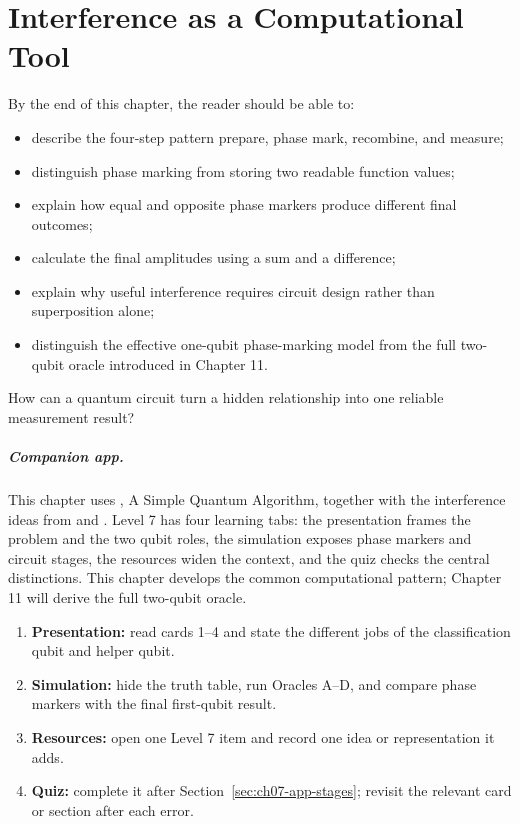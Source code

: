\chapter[Interference and Computation]{Interference as a Computational Tool}
\label{chap:interference-computation}

\begin{learningobjectives}
By the end of this chapter, the reader should be able to:
\begin{itemize}
  \item describe the four-step pattern prepare, phase mark, recombine, and measure;
  \item distinguish phase marking from storing two readable function values;
  \item explain how equal and opposite phase markers produce different final outcomes;
  \item calculate the final amplitudes using a sum and a difference;
  \item explain why useful interference requires circuit design rather than superposition alone;
  \item distinguish the effective one-qubit phase-marking model from the full two-qubit oracle introduced in Chapter 11.
\end{itemize}
\end{learningobjectives}

\begin{openingquestion}
How can a quantum circuit turn a hidden relationship into one reliable measurement result?
\end{openingquestion}

\paragraph{Companion app.}
This chapter uses , A Simple Quantum Algorithm, together with the interference ideas from  and . Level 7 has four learning tabs: the presentation frames the problem and the two qubit roles, the simulation exposes phase markers and circuit stages, the resources widen the context, and the quiz checks the central distinctions. This chapter develops the common computational pattern; Chapter 11 will derive the full two-qubit oracle.

\begin{appactivity}
\begin{enumerate}
  \item \textbf{Presentation:} read cards 1--4 and state the different jobs of the classification qubit and helper qubit.
  \item \textbf{Simulation:} hide the truth table, run Oracles A--D, and compare phase markers with the final first-qubit result.
  \item \textbf{Resources:} open one Level 7 item and record one idea or representation it adds.
  \item \textbf{Quiz:} complete it after Section~\ref{sec:ch07-app-stages}; revisit the relevant card or section after each error.
\end{enumerate}
\end{appactivity}

